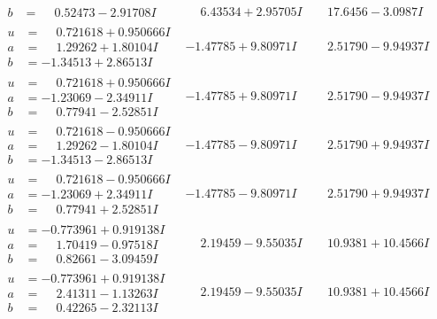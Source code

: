 \documentclass[1p]{elsarticle_modified}
\theoremstyle{definition}
\begin{document}
$$\begin{array}{c|c|c}
\begin{aligned}
b &= \phantom{-}0.52473 - 2.91708 I\end{aligned}
 & \phantom{-}6.43534 + 2.95705 I & \phantom{-}17.6456 - 3.0987 I \\ \hline\begin{aligned}
u &= \phantom{-}0.721618 + 0.950666 I \\
a &= \phantom{-}1.29262 + 1.80104 I \\
b &= -1.34513 + 2.86513 I\end{aligned}
 & -1.47785 + 9.80971 I & \phantom{-}2.51790 - 9.94937 I \\ \hline\begin{aligned}
u &= \phantom{-}0.721618 + 0.950666 I \\
a &= -1.23069 - 2.34911 I \\
b &= \phantom{-}0.77941 - 2.52851 I\end{aligned}
 & -1.47785 + 9.80971 I & \phantom{-}2.51790 - 9.94937 I \\ \hline\begin{aligned}
u &= \phantom{-}0.721618 - 0.950666 I \\
a &= \phantom{-}1.29262 - 1.80104 I \\
b &= -1.34513 - 2.86513 I\end{aligned}
 & -1.47785 - 9.80971 I & \phantom{-}2.51790 + 9.94937 I \\ \hline\begin{aligned}
u &= \phantom{-}0.721618 - 0.950666 I \\
a &= -1.23069 + 2.34911 I \\
b &= \phantom{-}0.77941 + 2.52851 I\end{aligned}
 & -1.47785 - 9.80971 I & \phantom{-}2.51790 + 9.94937 I \\ \hline\begin{aligned}
u &= -0.773961 + 0.919138 I \\
a &= \phantom{-}1.70419 - 0.97518 I \\
b &= \phantom{-}0.82661 - 3.09459 I\end{aligned}
 & \phantom{-}2.19459 - 9.55035 I & \phantom{-}10.9381 + 10.4566 I \\ \hline\begin{aligned}
u &= -0.773961 + 0.919138 I \\
a &= \phantom{-}2.41311 - 1.13263 I \\
b &= \phantom{-}0.42265 - 2.32113 I\end{aligned}
 & \phantom{-}2.19459 - 9.55035 I & \phantom{-}10.9381 + 10.4566 I\\

\end{array}$$
\end{document}

